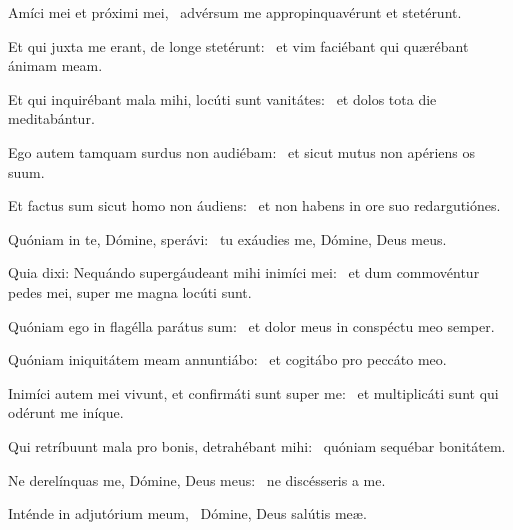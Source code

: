 
\item Amíci mei et próximi mei,~\psstar{} advérsum me appropinquavérunt et stetérunt.

\item Et qui juxta me erant, de longe stetérunt:~\psstar{} et vim faciébant qui quærébant ánimam meam.

\item Et qui inquirébant mala mihi, locúti sunt vanitátes:~\psstar{} et dolos tota die meditabántur.

\item Ego autem tamquam surdus non audiébam:~\psstar{} et sicut mutus non apériens os suum.

\item Et factus sum sicut homo non áudiens:~\psstar{} et non habens in ore suo redargutiónes.

\item Quóniam in te, Dómine, sperávi:~\psstar{} tu exáudies me, Dómine, Deus meus.

\item Quia dixi: Nequándo supergáudeant mihi inimíci mei:~\psstar{} et dum commovéntur pedes mei, super me magna locúti sunt.

\item Quóniam ego in flagélla parátus sum:~\psstar{} et dolor meus in conspéctu meo semper.

\item Quóniam iniquitátem meam annuntiábo:~\psstar{} et cogitábo pro peccáto meo.

\item Inimíci autem mei vivunt, et confirmáti sunt super me:~\psstar{} et multiplicáti sunt qui odérunt me iníque.

\item Qui retríbuunt mala pro bonis, detrahébant mihi:~\psstar{} quóniam sequébar bonitátem.

\item Ne derelínquas me, Dómine, Deus meus:~\psstar{} ne discésseris a me.

\item Inténde in adjutórium meum,~\psstar{} Dómine, Deus salútis meæ.